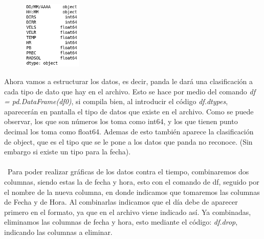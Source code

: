 \documentclass[12pt]{article}
\begin{document}
\begin{figure}
    \centering
    \includegraphics[width=0.25\textwidth]{TiposDatos.png}
\end{figure}
Ahora vamos a estructurar los datos, es decir, panda le dará una clasificación a cada tipo de dato que hay en el archivo. Esto se hace por medio del comando \textit{df = pd.DataFrame(df0)}, si compila bien, al introducir el código \textit{df.dtypes}, aparecerán en pantalla el tipo de datos que existe en el archivo. Como se puede observar, los que son números los toma como int64, y los que tienen punto decimal los toma como float64. Ademas de esto también aparece la clasificación de object, que es el tipo que se le pone a los datos que panda no reconoce. (Sin embargo si existe un tipo para la fecha).\\\\\
Para poder realizar gráficas de los datos contra el tiempo, combinaremos dos columnas, siendo estas la de fecha y hora, esto con el comando de df, seguido por el nombre de la nueva columna, en donde indicamos que tomaremos las columnas de Fecha y de Hora. Al combinarlas indicamos que el día debe de aparecer primero en el formato, ya que en el archivo viene indicado así. Ya combinadas, eliminamos las columnas de fecha y hora, esto mediante el código: \textit{df.drop}, indicando las columnas a eliminar. \\
\end{document}
